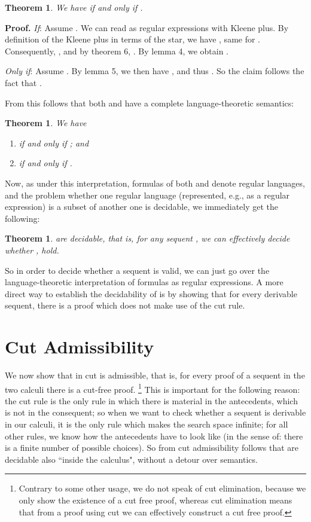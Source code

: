 \documentclass{eptcs}
\newtheorem{thm}[defn]{Theorem}
\newcommand{\proofbeg}{\textbf{Proof. }}
\newcommand{\proofend}{\hfill }
\begin{document}
\begin{thm}
We have  if and only if 
.
\end{thm}

\proofbeg
\textit{If}: Assume . 
We can read
 as regular expressions with Kleene plus. By definition of the
Kleene plus in terms of the star, we have ,
same for . Consequently, ,
and by theorem 6, . By lemma 4,
we obtain . 

\textit{Only if}: Assume . 
By lemma 5, we then have , and thus
. So the claim
follows the fact that .
\proofend

From this follows that both  and  have a complete
language-theoretic semantics:

\begin{thm}
We have 
\begin{enumerate}
\item  if and only if 
; and
\item  if and only if 
.
\end{enumerate}
\end{thm}

Now, as under this interpretation, formulas of both  and
 denote regular languages, and the problem whether one
regular language (represented, e.g., as a regular expression)
is a subset of another one is decidable, we immediately get the following:

\begin{thm}
 are decidable, that is, for any sequent ,
we can effectively decide whether ,
 hold.
\end{thm}

So in order to decide whether a sequent is valid, we can just go
over the language-theoretic interpretation of formulas as regular
expressions. A more direct way to establish the
decidability of  is by showing that for every derivable
sequent, there is a proof which does not make use of the cut rule.


\section{Cut Admissibility}

We now show that in  cut is admissible, 
that is, for every proof of a sequent in the two calculi
there is a  cut-free proof.
\footnote{Contrary to some other
usage, we do not speak of cut elimination, because we only show
the existence of a cut free proof, whereas cut elimination means
that from a proof using cut we can effectively construct a cut free
proof.} 
This is important for the following reason:
the cut rule is the only rule in which there is material
in the antecedents, which is not in the consequent; so when we 
want to check whether a sequent is derivable in our
calculi, it is the only rule which makes the search space infinite;
for all other rules, we know how the antecedents have
to look like (in the sense of: there is a finite number of 
possible choices). So from cut admissibility follows that  are
decidable also ``inside the calculus", without a detour over
semantics. 
\end{document}
